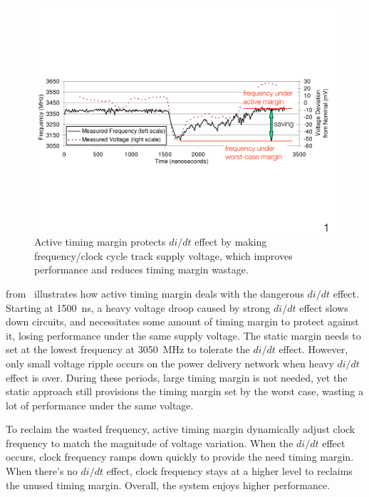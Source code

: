 \begin{figure}[t!]
\centering 
  \includegraphics[trim=0 200 0 200,clip,width=0.95\linewidth]{graphs/background/example.pdf}
  \caption{Active timing margin protects $di/dt$ effect by making frequency/clock cycle track supply voltage, which improves performance and reduces timing margin wastage.}
  \label{fig:didt-example}
\vspace{-0.2in}
\end{figure}

 from~\cite{lefurgy2011active} illustrates how active timing margin deals with the dangerous $di/dt$ effect. Starting at 1500~ns, a heavy voltage droop caused by strong $di/dt$ effect slows down circuits, and necessitates some amount of timing margin to protect against it, losing performance under the same supply voltage. The static margin needs to set at the lowest frequency at 3050~MHz to tolerate the $di/dt$ effect. However, only small voltage ripple occurs on the power delivery network when heavy $di/dt$ effect is over. During these periods, large timing margin is not needed, yet the static approach still provisions the timing margin set by the worst case, wasting a lot of performance under the same voltage. 

To reclaim the wasted frequency, active timing margin dynamically adjust clock frequency to match the magnitude of voltage variation. When the $di/dt$ effect occurs, clock frequency ramps down quickly to provide the need timing margin. When there's no $di/dt$ effect, clock frequency stays at a higher level to reclaims the unused timing margin. Overall, the system enjoys higher performance.